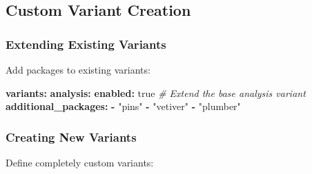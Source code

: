 \documentclass[
]{article}
\newenvironment{Shaded}{\begin{snugshade}}{\end{snugshade}}
\newcommand{\AttributeTok}[1]{\textcolor[rgb]{0.13,0.29,0.53}{#1}}
\newcommand{\CharTok}[1]{\textcolor[rgb]{0.31,0.60,0.02}{#1}}
\newcommand{\CommentTok}[1]{\textcolor[rgb]{0.56,0.35,0.01}{\textit{#1}}}
\newcommand{\FunctionTok}[1]{\textcolor[rgb]{0.13,0.29,0.53}{\textbf{#1}}}
\newcommand{\KeywordTok}[1]{\textcolor[rgb]{0.13,0.29,0.53}{\textbf{#1}}}
\newcommand{\StringTok}[1]{\textcolor[rgb]{0.31,0.60,0.02}{#1}}
\begin{document}
\subsection{Custom Variant Creation}\label{custom-variant-creation}

\subsubsection{Extending Existing
Variants}\label{extending-existing-variants}

Add packages to existing variants:

\begin{Shaded}
\begin{Highlighting}[]
\FunctionTok{variants}\KeywordTok{:}
\AttributeTok{  }\FunctionTok{analysis}\KeywordTok{:}
\AttributeTok{    }\FunctionTok{enabled}\KeywordTok{:}\AttributeTok{ }\CharTok{true}
\CommentTok{    \# Extend the base analysis variant}
\AttributeTok{    }\FunctionTok{additional\_packages}\KeywordTok{:}
\AttributeTok{      }\KeywordTok{{-}}\AttributeTok{ }\StringTok{"pins"}
\AttributeTok{      }\KeywordTok{{-}}\AttributeTok{ }\StringTok{"vetiver"}
\AttributeTok{      }\KeywordTok{{-}}\AttributeTok{ }\StringTok{"plumber"}
\end{Highlighting}
\end{Shaded}

\subsubsection{Creating New Variants}\label{creating-new-variants}

Define completely custom variants:
\end{document}
